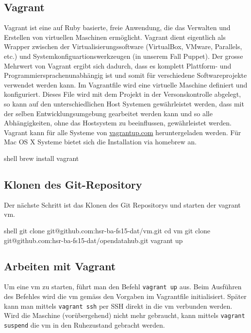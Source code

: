 \subsection{Vagrant}
Vagrant ist eine auf Ruby basierte, freie Anwendung, die das Verwalten und Erstellen von virtuellen Maschinen ermöglicht. Vagrant dient eigentlich als Wrapper zwischen der Virtualisierungssoftware (VirtualBox, VMware, Parallels, etc.) und Systemkonfiguartionswerkzeugen (in unserem Fall Puppet).
Der grosse Mehrwert von Vagrant ergibt sich dadurch, dass es komplett Plattform- und Programmiersprachenunabhängig ist und somit für verschiedene Softwareprojekte verwendet werden kann. Im Vagrantfile wird eine virtuelle Maschine definiert und konfiguriert. Dieses File wird mit dem Projekt in der Versonskontrolle abgelegt, so kann auf den unterschiedlichen Host Systemen gewährleistet werden, dass mit der selben Entwicklungsumgebung gearbeitet werden kann und so alle Abhängigkeiten, ohne das Hostsystem zu beeinflussen, gewährleistet werden.\\


Vagrant kann für alle Systeme von \url{vagrantup.com} heruntergeladen werden.
Für Mac OS X Systeme bietet sich die Installation via homebrew an.
\begin{src}{shell}
brew install vagrant
\end{src}

\subsection{Klonen des Git-Repository}
Der nächste Schritt ist das Klonen des Git Repositorys und starten der vagrant vm.
\begin{src}{shell}
git clone git@github.com:hsr-ba-fs15-dat/vm.git
cd vm
git clone git@github.com:hsr-ba-fs15-dat/opendatahub.git
vagrant up
\end{src}


\subsection{Arbeiten mit Vagrant}
Um eine \gls{vm} zu starten, führt man den Befehl \texttt{vagrant up} aus. Beim Ausführen des Befehles wird die \gls{vm} gemäss den Vorgaben im Vagrantfile initialisiert. Später kann man mittels \texttt{vagrant ssh} per SSH direkt in die \gls{vm} verbunden werden. Wird die Maschine (vorübergehend) nicht mehr gebraucht, kann mittels \texttt{vagrant suspend} die \gls{vm} in den Ruhezustand gebracht werden.


